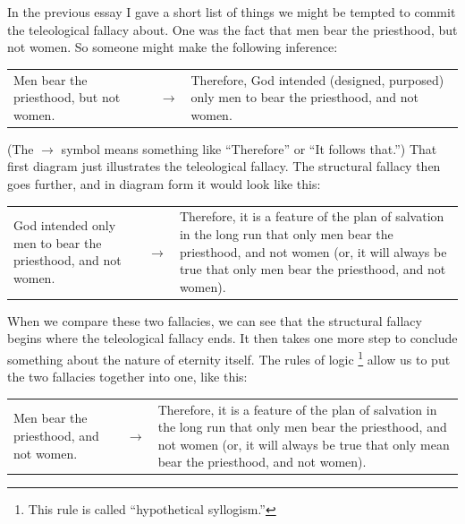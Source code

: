 		In the previous essay I gave a short list of things we might be tempted to commit the teleological fallacy about.
		One was the fact that men bear the priesthood,
			but not women.
		So someone might make the following inference:
		
		\begin{table}[H]
		\centering
		\begin{tabular}{p{7cm}p{0.5cm}p{7cm}}
		Men bear the priesthood, but not women. & $\rightarrow$ & Therefore, God intended (designed, purposed) only men to bear the priesthood, and not women.
		\end{tabular}
		\end{table}
		
		(The $\rightarrow$ symbol means something like ``Therefore'' or ``It follows that.'')
		That first diagram just illustrates the teleological fallacy.
		The structural fallacy then goes further,
			and in diagram form it would look like this:
		
		\begin{table}[H]
		\centering
		\begin{tabular}{p{7cm}p{0.5cm}p{7cm}}
		God intended only men to bear the priesthood, and not women. & $\rightarrow$ & Therefore, it is a feature of the plan of salvation in the long run that only men bear the priesthood, and not women (or, it will always be true that only men bear the priesthood, and not women).
		\end{tabular}
		\end{table}
		
		When we compare these two fallacies,
			we can see that the structural fallacy begins where the teleological fallacy ends.
		It then takes one more step to conclude something about the nature of eternity itself.
		The rules of logic%
			\footnote{This rule is called ``hypothetical syllogism.''}
			allow us to put the two fallacies together into one,
				like this:
				
		\begin{table}[H]
		\centering
		\begin{tabular}{p{7cm}p{0.5cm}p{7cm}}
		Men bear the priesthood, and not women. & $\rightarrow$ & Therefore, it is a feature of the plan of salvation in the long run that only men bear the priesthood, and not women (or, it will always be true that only mean bear the priesthood, and not women).
		\end{tabular}
		\end{table}
		
